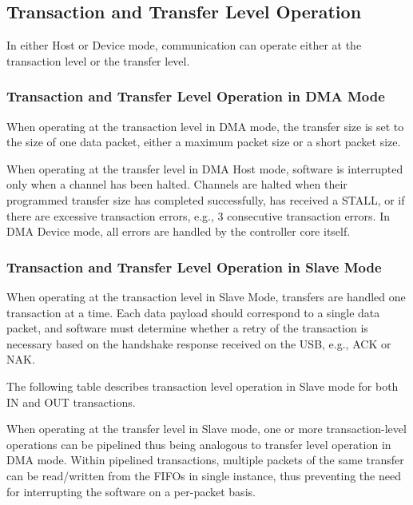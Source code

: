 \documentclass[main\_\_EN.tex]{subfiles}
\begin{document}
\subsection{Transaction and Transfer Level Operation}

In either Host or Device mode, communication can operate either at the transaction level or the transfer level.

\subsubsection{Transaction and Transfer Level Operation in DMA Mode}

When operating at the transaction level in DMA mode, the transfer size is set to the size of one data packet, either a maximum packet size or a short packet size.

When operating at the transfer level in DMA Host mode, software is interrupted only when a channel has been halted. Channels are halted when their programmed transfer size has completed successfully, has received a STALL, or if there are excessive transaction errors, e.g., 3 consecutive transaction errors. In DMA Device mode, all errors are handled by the controller core itself.

\subsubsection{Transaction and Transfer Level Operation in Slave Mode}

When operating at the transaction level in Slave Mode, transfers are handled one transaction at a time. Each data payload should correspond to a single data packet, and software must determine whether a retry of the transaction is necessary based on the handshake response received on the USB, e.g., ACK or NAK.

The following table describes transaction level operation in Slave mode for both IN and OUT transactions.



When operating at the transfer level in Slave mode, one or more transaction-level operations can be pipelined thus being analogous to transfer level operation in DMA mode. Within pipelined transactions, multiple packets of the same transfer can be read/written from the FIFOs in single instance, thus preventing the need for interrupting the software on a per-packet basis.
\end{document}
